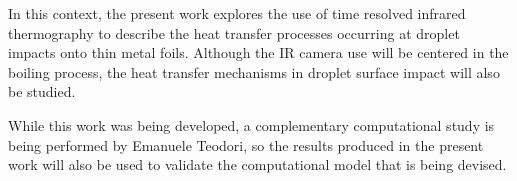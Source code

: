 \par In this context, the present work explores the use of time resolved infrared thermography to describe the heat transfer processes occurring at droplet impacts onto thin metal foils. Although the IR camera use will be centered in the boiling process, the heat transfer mechanisms in droplet surface impact will also be studied.\\

\par While this work was being developed, a complementary computational study is being performed by  Emanuele Teodori, so the results produced in the present work will also be used to validate the computational model that is being devised.